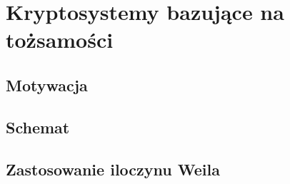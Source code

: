 \section{Kryptosystemy bazujące na tożsamości}

\subsection*{Motywacja}

\noindent
{}

\subsection*{Schemat}

\noindent
{}

\subsection*{Zastosowanie iloczynu Weila}

\noindent
{}
